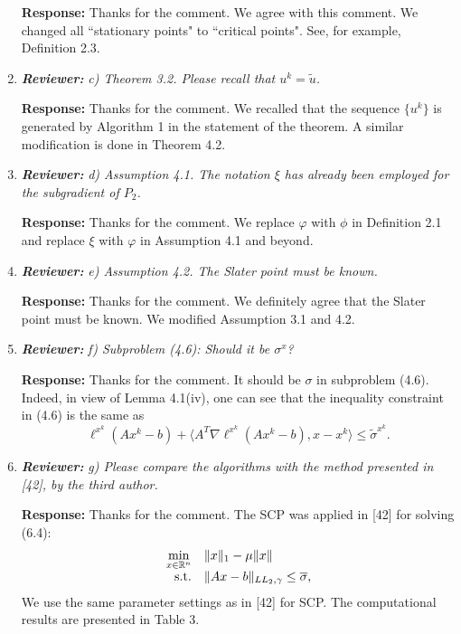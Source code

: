 \documentclass{article}
\def\R{\mathbb{R}}
\begin{document}
\begin{enumerate}
	\textbf{Response:} Thanks for the comment. We agree with this comment. We changed all ``stationary points" to ``critical points". See, for example, Definition 2.3.
	
	\item  \textit{\textbf{Reviewer:}} \textit{ c) Theorem 3.2. Please recall that $u^k = \tilde u$.}
	
	\textbf{Response:} Thanks for the comment. We recalled that the sequence $\{u^k\}$ is generated by Algorithm 1 in the statement of the theorem. A similar modification is done in Theorem 4.2.

	\item \textit{\textbf{Reviewer:}} \textit{ d) Assumption 4.1. The notation $\xi$ has already been employed for the subgradient of $P_2$.}

    \textbf{Response:} Thanks for the comment. We replace $\varphi$ with $\phi$ in Definition 2.1 and replace $\xi$ with $\varphi$ in Assumption 4.1 and beyond.

	\item \textit{\textbf{Reviewer:}} \textit{ e) Assumption 4.2. The Slater point must be known.}

    \textbf{Response:} Thanks for the comment. We definitely agree that the Slater point must be known. We modified Assumption 3.1 and 4.2.

	\item \textit{\textbf{Reviewer:}} \textit{ f) Subproblem (4.6): Should it be $\sigma^x$?}

    \textbf{Response:} Thanks for the comment. It should be $\sigma$ in subproblem (4.6). Indeed, in view of Lemma 4.1(iv), one can see that the inequality constraint in (4.6) is the same as
    \[
    \ell^{x^k}(Ax^k - b) + \langle A^T\nabla \ell^{x^k}(Ax^k - b),x-x^k\rangle \le \tilde \sigma^{x^k}.
    \]

	\item \textit{\textbf{Reviewer:}} \textit{ g) Please compare the algorithms with the method presented in [42], by the third author.}

    \textbf{Response:} Thanks for the comment. The SCP was applied in [42] for solving (6.4):
    \begin{equation}\label{pr1}
       \begin{array}{rl}
        \min\limits_{x\in\R^n} & \|x\|_1 - \mu\|x\| \\
        {\rm s.t.} & \|Ax - b\|_{LL_2,\gamma}\leq \overline{\sigma},
       \end{array}
     \end{equation}
    We use the same parameter settings as in [42] for SCP. The computational results are presented in Table 3.


\end{enumerate}
\end{document}
